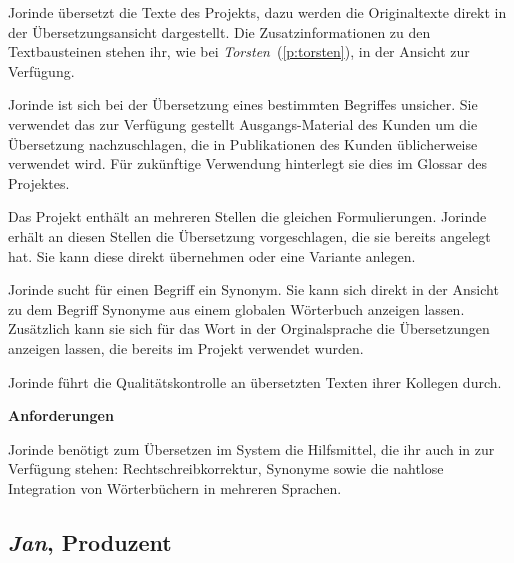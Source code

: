 \begin{multicols}{2}
Jorinde übersetzt die Texte des Projekts, dazu werden die Originaltexte direkt in der Übersetzungsansicht dargestellt. Die Zusatzinformationen zu den Textbausteinen stehen ihr, wie bei \emph{Torsten}~(\ref{p:torsten}), in der Ansicht zur Verfügung.

Jorinde ist sich bei der Übersetzung eines bestimmten Begriffes unsicher. Sie verwendet das zur Verfügung gestellt Ausgangs-Material des Kunden um die Übersetzung nachzuschlagen, die in Publikationen des Kunden üblicherweise verwendet wird. Für zukünftige Verwendung hinterlegt sie dies im Glossar des Projektes.

Das Projekt enthält an mehreren Stellen die gleichen Formulierungen. Jorinde erhält an diesen Stellen die Übersetzung vorgeschlagen, die sie bereits angelegt hat. Sie kann diese direkt übernehmen oder eine Variante anlegen.

Jorinde sucht für einen Begriff ein Synonym. Sie kann sich direkt in der Ansicht zu dem Begriff Synonyme aus einem globalen Wörterbuch anzeigen lassen. Zusätzlich kann sie sich für das Wort in der Orginalsprache die Übersetzungen anzeigen lassen, die bereits im Projekt verwendet wurden.

Jorinde führt die Qualitätskontrolle an übersetzten Texten ihrer Kollegen durch.

\textbf{Anforderungen}

Jorinde benötigt zum Übersetzen im System die Hilfsmittel, die ihr auch in  zur Verfügung stehen: Rechtschreibkorrektur, Synonyme sowie die nahtlose Integration von Wörterbüchern in mehreren Sprachen.

\end{multicols}

\pagebreak

\subsection{\emph{Jan}, Produzent}\label{p:jan}

